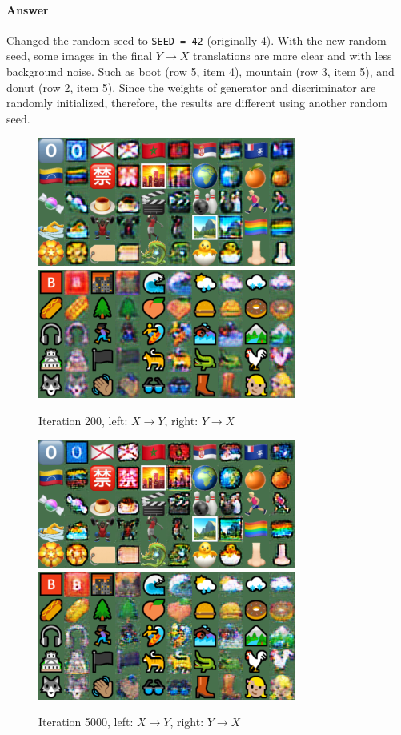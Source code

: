 \documentclass{article}
\begin{document}
	\paragraph{Answer} Changed the random seed to \texttt{SEED = 42} (originally 4). With the new random seed, some images in the final $Y \to X$ translations are more clear and with less background noise. Such as boot (row 5, item 4), mountain (row 3, item 5), and donut (row 2, item 5).
	Since the weights of generator and discriminator are randomly initialized, therefore, the results are different using another random seed.
	\begin{figure}[H]
		\centering
		\caption{Iteration 200, left: $X \to Y$, right: $Y \to X$}
		\includegraphics[width=0.45\linewidth]{./samples_cyclegan_Q2_seed42/sample-000200-X-Y.png}
		\includegraphics[width=0.45\linewidth]{./samples_cyclegan_Q2_seed42/sample-000200-Y-X.png}
	\end{figure}
	\begin{figure}[H]
		\centering
		\caption{Iteration 5000, left: $X \to Y$, right: $Y \to X$}
		\includegraphics[width=0.45\linewidth]{./samples_cyclegan_Q2_seed42/sample-005000-X-Y.png}
		\includegraphics[width=0.45\linewidth]{./samples_cyclegan_Q2_seed42/sample-005000-Y-X.png}
	\end{figure}
\end{document}
